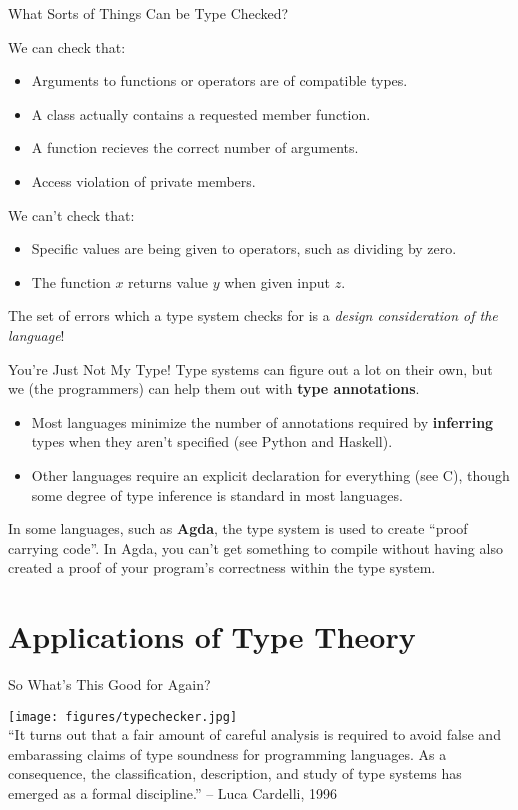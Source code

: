 \documentclass[11pt]{beamer}
\begin{document}
\begin{frame}{What Sorts of Things Can be Type Checked?}

\center
We can check that:
\vspace{-0.5em}
\flushleft
\begin{itemize}
\item Arguments to functions or operators are of compatible types.
\item A class actually contains a requested member function.
\item A function recieves the correct number of arguments.
\item Access violation of private members.
\end{itemize}
\center
We can't check that:
\flushleft
\begin{itemize}
\item Specific values are being given to operators, such as dividing by zero.
\item The function $x$ returns value $y$ when given input $z$.
\end{itemize}
\vspace{0.5em}
The set of errors which a type system checks for is a \emph{design consideration of the language}!  
\end{frame}

\begin{frame}[fragile=singleslide]{You're Just Not My Type!}
Type systems can figure out a lot on their own, but we (the programmers) can help them out with \textbf{type annotations}.
\begin{itemize}
\item Most languages minimize the number of annotations required by \textbf{inferring} types when they aren't specified (see Python and Haskell).
\item Other languages require an explicit declaration for everything (see C), though some degree of type inference is standard in most languages.
\end{itemize}
In some languages, such as \textbf{Agda}, the type system is used to create ``proof carrying code''.  In Agda, you can't get something to compile without having also created a proof of your program's correctness within the type system.  
\end{frame}

\section[Applications]{Applications of Type Theory}
\begin{frame}[fragile=singleslide]{So What's This Good for Again?}
\begin{center}
\texttt{[image: figures/typechecker.jpg]} \\
``It turns out that a fair amount of careful analysis is required to avoid false and embarassing claims of type soundness for programming languages.  As a consequence, the classification, description, and study of type systems has emerged as a formal discipline.''  -- Luca Cardelli, 1996
\end{center}
\end{frame}
\end{document}
